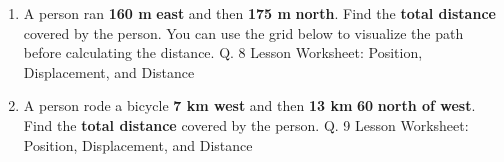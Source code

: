 \documentclass[A4,12pt]{article}
\begin{document}
\begin{enumerate}[label=\bfseries (\arabic*)]
\item A person ran \textbf{160 m} \textbf{east} and then \textbf{175 m} \textbf{north}. Find the \textbf{total distance} covered by the person. You can use the grid below to visualize the path before calculating the distance. \cite{Nagwa} Q. 8 Lesson Worksheet: Position, Displacement, and Distance
\begin{figure}[H]
    \centering
\end{figure}
%
%














\item A person rode a bicycle \textbf{7 km west} and then \textbf{13 km} \textbf{60\degree} \textbf{north of west}. Find the \textbf{total distance} covered by the person. \cite{Nagwa} Q. 9 Lesson Worksheet: Position, Displacement, and Distance
%
%




















\end{enumerate}
\end{document}
